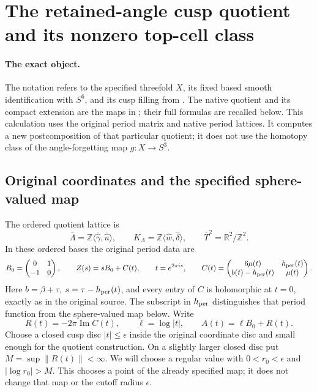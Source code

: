\documentclass[11pt,letterpaper]{article}
\numberwithin{equation}{section}
\theoremstyle{definition}
\theoremstyle{remark}
\begin{document}

\section{The retained-angle cusp quotient and its nonzero top-cell class}
\label{ret:section}

\paragraph{The exact object.}
The notation refers to the specified threefold \(X\), its fixed based
smooth identification with \(S^6\), and its cusp filling from
\cite[\S\S3.7,4.1--4.5]{retbib:Canonical}.  The native quotient and its compact
extension are the maps in \cite{retbib:ConeRoutes}; their full formulas are
recalled below.  This calculation uses the original period matrix and
native period lattices.  It computes a new postcomposition of that
particular quotient; it does not use the homotopy class of the
angle-forgetting map \(g:X\to S^3\).

\subsection{Original coordinates and the specified sphere-valued map}

The ordered quotient lattice is
\[
 \overline\Lambda=\mathbb Z\langle\overline{\widehat\gamma},
              \overline{\widehat u}\rangle,
 \qquad
 K_\Lambda=\mathbb Z\langle\widehat w,\widehat\delta\rangle,
 \qquad
 \overline T^2=\mathbb R^2/\mathbb Z^2.
\]
In these ordered bases the original period data are
\begin{equation}
 B_0=\begin{pmatrix}0&1\\-1&0\end{pmatrix},\qquad
 Z(s)=sB_0+C(t),\qquad t=e^{2\pi i s},\qquad
 C(t)=\begin{pmatrix}6\mu(t)&h_{\rm per}(t)\\
 b(t)-h_{\rm per}(t)&\mu(t)\end{pmatrix}.
 \label{ret:eq:original-periods}
\end{equation}
Here \(b=\beta+\tau\), \(s=\tau-h_{\rm per}(t)\), and every entry of
\(C\) is holomorphic at \(t=0\), exactly as in the original source.
The subscript in \(h_{\rm per}\) distinguishes that period function
from the sphere-valued map below.  Write
\begin{equation}
 R(t)=-2\pi\operatorname{Im}C(t),\qquad
 \ell=\log|t|,\qquad A(t)=\ell B_0+R(t).
 \label{ret:eq:A}
\end{equation}
Choose a closed cusp disc \(|t|\leq\epsilon\) inside the original
coordinate disc and small enough for the quotient construction.  On a
slightly larger closed disc put \(M=\sup\|R(t)\|<\infty\).  We will
choose a regular value with \(0<r_0<\epsilon\) and
\(|\log r_0|>M\).  This chooses a point of the already specified map;
it does not change that map or the cutoff radius \(\epsilon\).
\end{document}
